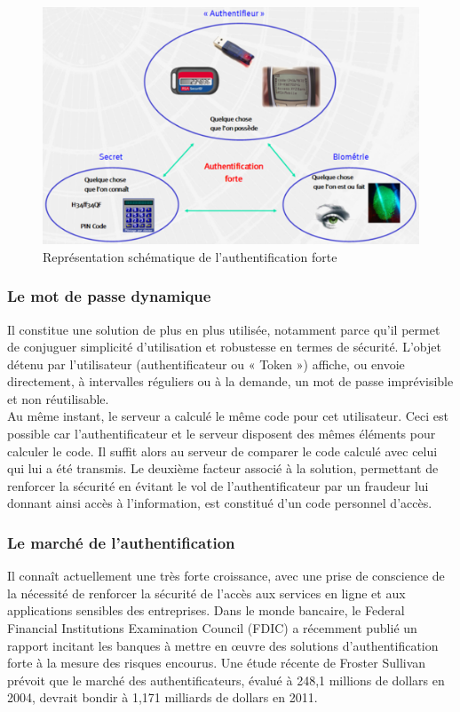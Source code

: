 \begin{figure}[!htbp]
  \centering
    \includegraphics[scale=1]{images/relation}
  \caption{Représentation schématique de l’authentification forte}
\end{figure}

\subsubsection{Le mot de passe dynamique}
Il constitue une solution de plus en plus utilisée, notamment parce qu’il permet de conjuguer simplicité d’utilisation et robustesse en termes de sécurité. L’objet détenu par l’utilisateur (authentificateur ou « Token ») affiche, ou envoie directement, à intervalles réguliers ou à la demande, un mot de passe imprévisible et non réutilisable.\\

Au même instant, le serveur a calculé le même code pour cet utilisateur. Ceci est possible car l’authentificateur et le serveur disposent des mêmes éléments pour calculer le code. Il suffit alors au serveur de comparer le code calculé avec celui qui lui a été transmis. Le deuxième facteur associé à la solution, permettant de renforcer la sécurité en évitant le vol de l’authentificateur par un fraudeur lui donnant ainsi accès à l’information, est constitué d’un code personnel d’accès.

\subsubsection{Le marché de l’authentification}
Il connaît actuellement une très forte croissance, avec une prise de conscience de la nécessité de renforcer la sécurité de l’accès aux services en ligne et aux applications sensibles des entreprises. Dans le monde bancaire, le Federal Financial Institutions Examination Council (FDIC) a récemment publié un rapport incitant les banques à mettre en œuvre des solutions d’authentification forte à la mesure des risques encourus. Une étude récente de Froster Sullivan prévoit que le marché des authentificateurs, évalué à 248,1 millions de dollars en 2004, devrait bondir à 1,171 milliards de dollars en 2011.

